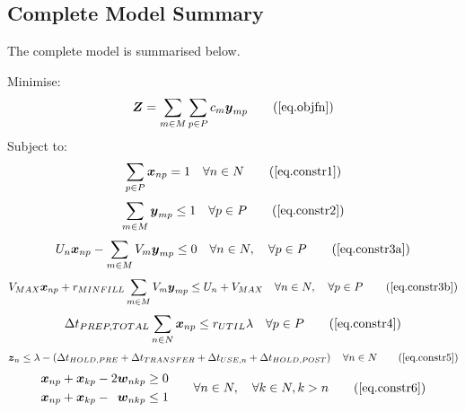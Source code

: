 \subsection{Complete Model Summary}\label{SS.completesummary}

The complete model is summarised below.

Minimise:
\begin{equation}
    \boldsymbol{Z} = \sum_{m \in M} \sum_{p \in P} c_m \boldsymbol{y}_{mp}
    \tag{\ref{eq.objfn}}
\end{equation}
Subject to:
\begin{equation}
    \sum_{p \in P} \boldsymbol{x}_{np} = 1 \quad \forall n \in N
    \tag{\ref{eq.constr1}}
\end{equation}
\begin{equation}
    \sum_{m \in M} \boldsymbol{y}_{mp} \le 1 \quad \forall p \in P
    \tag{\ref{eq.constr2}}
\end{equation}
\begin{equation}
    U_{n} \boldsymbol{x}_{np} - \sum_{m \in M} V_{m} \boldsymbol{y}_{mp} \le 0
    \quad \forall n \in N, \quad \forall p \in P
    \tag{\ref{eq.constr3a}}
\end{equation}
\begin{equation}
    V_{MAX} \boldsymbol{x}_{np} + r_{MINFILL} \sum_{m \in M} V_{m}
    \boldsymbol{y}_{mp} \le U_{n} + V_{MAX} \quad \forall n \in N, \quad
    \forall p \in P
    \tag{\ref{eq.constr3b}}
\end{equation}
\begin{equation}
    \Delta t_{PREP,TOTAL} \sum_{n \in N} \boldsymbol{x}_{np} \le r_{UTIL}
    \lambda \quad \forall p \in P
    \tag{\ref{eq.constr4}}
\end{equation}
\begin{equation}
    \boldsymbol{z}_{n} \le \lambda - \left( \Delta t_{HOLD,PRE} +
    \Delta t_{TRANSFER} + \Delta t_{USE,n} + \Delta t_{HOLD,POST} \right)
    \quad \forall n \in N
    \tag{\ref{eq.constr5}}
\end{equation}
\begin{equation}
    \begin{split}
        \begin{alignedat}{3}
            \boldsymbol{x}_{np} & {}+{} & \boldsymbol{x}_{kp} & {}-{} & 2
            \boldsymbol{w}_{nkp} & \ge 0\\
            \boldsymbol{x}_{np} & {}+{} & \boldsymbol{x}_{kp} & {}-{} &
            \boldsymbol{w}_{nkp} & \le 1\\
        \end{alignedat}
    \end{split}
    \quad\quad
    \begin{split}
        \forall n \in N, \quad \forall k \in N, k > n
    \end{split}
    \tag{\ref{eq.constr6}}
\end{equation}

